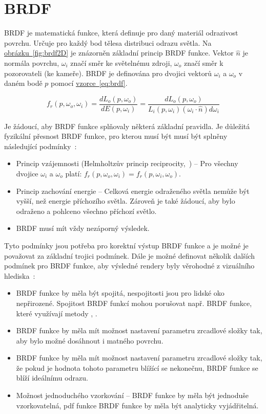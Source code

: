 \documentclass[czech,master]{diploma}
\newcommand{\uvec}[1]{\hat{#1}}
\newcommand{\point}{p}
\newcommand{\brdf}{f_r\left(\point,\omega_{o},\omega_{i}\right)}
\newcommand{\normVec}{\uvec{n}}
\newcommand{\inVec}{\omega_{i}}
\newcommand{\outVec}{\omega_{o}}
\newcommand{\outRadiance}{L_o\left(\point,\outVec\right)}
\newcommand{\inRadiance}{L_i\left(\point,\inVec\right)}
\newcommand{\difirradiance}{dE\left(\point,\inVec\right)}
\newcommand{\inDotNorm}{\left(\inVec\cdot\normVec\right)}
\begin{document}
\clearpage
\chapter{BRDF}
BRDF je matematická funkce, která definuje pro daný materiál odrazivost povrchu. Určuje pro každý bod tělesa distribuci odrazu světla. Na \hyperref[fig:brdf2D]{obrázku~\ref{fig:brdf2D}} je znázorněn základní princip BRDF funkce. Vektor \(\normVec\) je normála povrchu, \(\inVec\) značí směr ke světelnému zdroji, \(\outVec\) značí směr k pozorovateli (ke kameře). BRDF je definována pro dvojici vektorů  \(\inVec\) a \(\outVec\) v daném bodě \(p\) pomocí \hyperref[eq:brdf]{vzorce~\ref{eq:brdf}}.

\begin{equation} \label{eq:brdf}
  \brdf = \frac{d\outRadiance}{\difirradiance} = \frac{d\outRadiance}{\inRadiance \inDotNorm d\inVec}
\end{equation}

Je žádoucí, aby BRDF funkce splňovaly některá základní pravidla. Je důležitá  fyzikální přesnost BRDF funkce, pro kterou musí být musí být splněny následující podmínky~\cite{PHARR2017313}:

\begin{itemize}
  \item Princip vzájemnosti (Helmholtzův princip reciprocity,~\cite{hapke_2012}) -- Pro všechny dvojice \(\inVec\) a \(\outVec\) platí: \(\brdf = f_r\left(p,\inVec,\outVec\right)\).
  \item Princip zachování energie -- Celková energie odraženého světla nemůže být vyšší, než energie příchozího světla. Zároveň je také žádoucí, aby bylo odraženo a pohlceno všechno příchozí světlo.
  \item BRDF musí mít vždy nezáporný výsledek.
\end{itemize}
Tyto podmínky jsou potřeba pro korektní výstup BRDF funkce a je možné je považovat za základní trojici podmínek. Dále je možné definovat několik dalších podmínek pro BRDF funkce, aby výsledné rendery byly věrohodné z vizuálního hlediska~\cite{EnergyConservingRadziszewski}:

\begin{itemize}
  \item BRDF funkce by měla být spojitá, nespojitosti jsou pro lidské oko nepřirozené. Spojitost BRDF funkcí mohou porušovat např. BRDF funkce, které využívají metody , .
  \item BRDF funkce by měla mít možnost nastavení parametru zrcadlové složky tak, aby bylo možné dosáhnout i matného povrchu.
  \item BRDF funkce by měla mít možnost nastavení parametru zrcadlové složky tak, že pokud je hodnota tohoto parametru blížící se nekonečnu, BRDF funkce se blíží ideálnímu odrazu.
  \item Možnost jednoduchého vzorkování -- BRDF funkce by měla být jednoduše vzorkovatelná, pdf funkce BRDF funkce by měla být analyticky vyjádřitelná.
\end{itemize}
\end{document}
